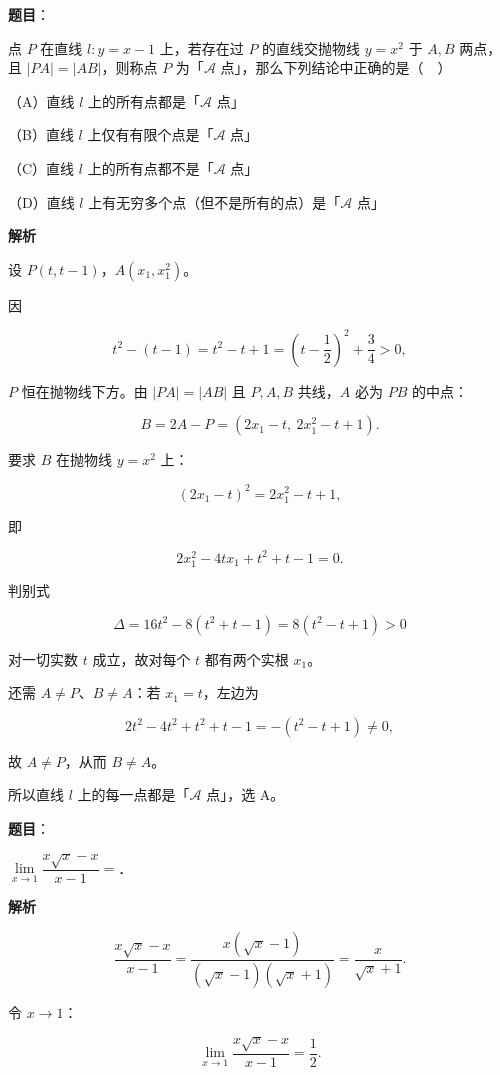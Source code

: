 \begin{answer}

\textbf{题目}：

点 $P$ 在直线 $l:y=x-1$ 上，若存在过 $P$ 的直线交抛物线 $y=x^2$ 于 $A,B$ 两点，且 $|PA|=|AB|$，则称点 $P$ 为「$\mathcal A$ 点」，那么下列结论中正确的是（　）

（A）直线 $l$ 上的所有点都是「$\mathcal A$ 点」

（B）直线 $l$ 上仅有有限个点是「$\mathcal A$ 点」

（C）直线 $l$ 上的所有点都不是「$\mathcal A$ 点」

（D）直线 $l$ 上有无穷多个点（但不是所有的点）是「$\mathcal A$ 点」

\textbf{解析}

设 $P(t,t-1)$，$A(x_1,x_1^2)$。

因

\nopagebreak[4]
\[t^2-(t-1)=t^2-t+1=\left(t-\frac12\right)^2+\frac34>0,\]

$P$ 恒在抛物线下方。由 $|PA|=|AB|$ 且 $P,A,B$ 共线，$A$ 必为 $PB$ 的中点：

\nopagebreak[4]
\[B=2A-P=(2x_1-t,\ 2x_1^2-t+1).\]

要求 $B$ 在抛物线 $y=x^2$ 上：

\nopagebreak[4]
\[(2x_1-t)^2=2x_1^2-t+1,\]

即

\nopagebreak[4]
\[2x_1^2-4tx_1+t^2+t-1=0 .\]

判别式

\nopagebreak[4]
\[\Delta=16t^2-8(t^2+t-1)=8(t^2-t+1)>0\]

对一切实数 $t$ 成立，故对每个 $t$ 都有两个实根 $x_1$。

还需 $A\neq P$、$B\neq A$：若 $x_1=t$，左边为

\nopagebreak[4]
\[2t^2-4t^2+t^2+t-1=-(t^2-t+1)\neq0,\]

故 $A\neq P$，从而 $B\neq A$。

所以直线 $l$ 上的每一点都是「$\mathcal A$ 点」，选 A。


\end{answer}
\begin{answer}

\textbf{题目}：

$\lim\limits_{x\to1}\dfrac{x\sqrt x-x}{x-1}=$\gkblank{}．

\textbf{解析}

\nopagebreak[4]
\[\frac{x\sqrt x-x}{x-1}
=\frac{x(\sqrt x-1)}{(\sqrt x-1)(\sqrt x+1)}
=\frac{x}{\sqrt x+1}.\]

令 $x\to1$：

\nopagebreak[4]
\[\lim_{x\to1}\frac{x\sqrt x-x}{x-1}=\frac{1}{2}.\]


\end{answer}
